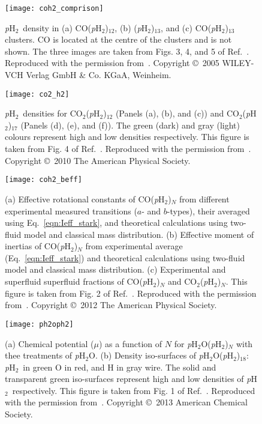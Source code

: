\documentclass[12pt]{iopart}
\newcommand{\pwater}{{\em p}H$_2$O}
\newcommand{\phtwo}{{\em p}H$_2$}
\begin{document}
\begin{figure}[h] 
\centerline {\texttt{[image: coh2\_comprison]}}
\caption{\phtwo~density in (a) CO(\phtwo)$_{12}$, (b) (\phtwo)$_{13}$, and (c) CO(\phtwo)$_{13}$ clusters. CO is located at the centre of the clusters and is not shown. The three images are taken from Figs. 3, 4, and 5 of Ref.~\cite{moroni_pH2_melting}. Reproduced with the permission from~\cite{moroni_pH2_melting}. Copyright \copyright~2005 WILEY-VCH Verlag GmbH \& Co. KGaA, Weinheim.} 
\label{fig:coh2_comp}
\end{figure}

\clearpage

\begin{figure}[h] 
\centerline {\texttt{[image: co2\_h2]}}
\caption{\phtwo~densities for CO$_2$(\phtwo)$_{12}$ (Panels (a), (b), and (c)) and CO$_2$(\phtwo)$_{17}$ (Panels (d), (e), and (f)). The green (dark) and gray (light) colours represent high and low densities respectively. This figure is taken from Fig. 4 of Ref.~\cite{huili_prl}. Reproduced with the permission from~\cite{huili_prl}. Copyright \copyright~2010 The American Physical Society.}
\label{fig:co2_h2}
\end{figure}

\begin{figure}[h] 
\centerline {\texttt{[image: coh2\_beff]}}
\caption{(a) Effective rotational constants of CO(\phtwo)$_N$ from different experimental measured transitions ($a$- and $b$-types), their averaged using Eq.~\ref{eqn:Ieff_stark}, and theoretical calculations using two-fluid model and classical mass distribution. (b) Effective moment of inertias of CO(\phtwo)$_N$ from experimental average (Eq.~\ref{eqn:Ieff_stark}) and theoretical calculations using two-fluid model and classical mass distribution. (c) Experimental and superfluid superfluid fractions of CO(\phtwo)$_N$ and CO$_2$(\phtwo)$_N$. This figure is taken from Fig. 2 of Ref.~\cite{raston_coh2_superfluid}. Reproduced with the permission from~\cite{raston_coh2_superfluid}. Copyright \copyright~2012 The American Physical Society.}
\label{fig:coh2_beff}
\end{figure}

\begin{figure}[h] 
\centerline {\texttt{[image: ph2oph2]}}
\caption{(a) Chemical potential ($\mu$) as a function of $N$ for \pwater(\phtwo)$_N$ with thee treatments of \pwater. (b) Density iso-surfaces of \pwater(\phtwo)$_{18}$: \phtwo~in green O in red, and H in gray wire. The solid and transparent green iso-surfaces represent high and low densities of \phtwo~respectively. This figure is taken from Fig. 1 of Ref.~\cite{tobywater}. Reproduced with the permission from~\cite{tobywater}. Copyright \copyright~2013 American Chemical Society.}
\label{fig:ph2oph2}
\end{figure}
\end{document}
